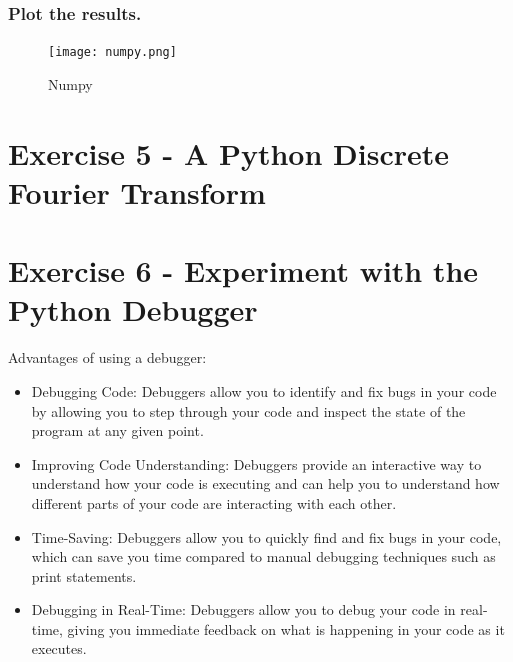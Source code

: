 \documentclass{article}
\begin{document}
\subsubsection{Plot the results.}

\begin{figure}[h]
    \centering
    \texttt{[image: numpy.png]}
    \caption{Numpy}
    \label{fig:numpy}
\end{figure}





\section{Exercise 5 - A Python Discrete Fourier Transform}


\section{Exercise 6 - Experiment with the Python Debugger}

Advantages of using a debugger:
\begin{itemize}
    \item Debugging Code: Debuggers allow you to identify and fix bugs in your code by allowing you to step through your code and inspect the state of the program at any given point.
    \item Improving Code Understanding: Debuggers provide an interactive way to understand how your code is executing and can help you to understand how different parts of your code are interacting with each other.
    \item Time-Saving: Debuggers allow you to quickly find and fix bugs in your code, which can save you time compared to manual debugging techniques such as print statements.
    \item Debugging in Real-Time: Debuggers allow you to debug your code in real-time, giving you immediate feedback on what is happening in your code as it executes.
\end{itemize}
\end{document}
